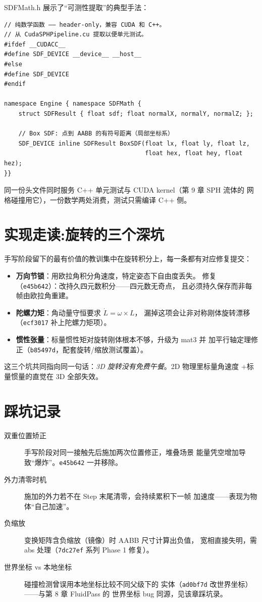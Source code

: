 SDFMath.h 展示了``可测性提取''的典型手法：

\begin{lstlisting}
// 纯数学函数 —— header-only，兼容 CUDA 和 C++。
// 从 CudaSPHPipeline.cu 提取以便单元测试。
#ifdef __CUDACC__
#define SDF_DEVICE __device__ __host__
#else
#define SDF_DEVICE
#endif

namespace Engine { namespace SDFMath {
    struct SDFResult { float sdf; float normalX, normalY, normalZ; };

    // Box SDF: 点到 AABB 的有符号距离（局部坐标系）
    SDF_DEVICE inline SDFResult BoxSDF(float lx, float ly, float lz,
                                       float hex, float hey, float hez);
}}
\end{lstlisting}

同一份头文件同时服务 C++ 单元测试与 CUDA kernel（第 9 章 SPH 流体的
网格碰撞用它），一份数学两处消费，测试只需编译 C++ 侧。

\section{实现走读:旋转的三个深坑}

手写阶段留下的最有价值的教训集中在旋转积分上，每一条都有对应修复提交：

\begin{itemize}
  \item \textbf{万向节锁}：用欧拉角积分角速度，特定姿态下自由度丢失。
        修复（\texttt{e45b642}）：改持久四元数积分——四元数无奇点，
        且必须持久保存而非每帧由欧拉角重建。
  \item \textbf{陀螺力矩}：角动量守恒要求 $\dot{L} = \omega \times L$，
        漏掉这项会让非对称刚体旋转漂移（\texttt{ecf3017} 补上陀螺力矩项）。
  \item \textbf{惯性张量}：标量惯性矩对旋转刚体根本不够，升级为 mat3 并
        加平行轴定理修正（\texttt{b85497d}，配套旋转/缩放测试覆盖）。
\end{itemize}

这三个坑共同指向同一句话：\emph{3D 旋转没有免费午餐}。2D 物理里标量角速度
+标量惯量的直觉在 3D 全部失效。

\section{踩坑记录}

\begin{description}
  \item[双重位置矫正] 手写阶段对同一接触先后施加两次位置修正，堆叠场景
        能量凭空增加导致``爆炸''。\texttt{e45b642} 一并移除。
  \item[外力清零时机] 施加的外力若不在 Step 末尾清零，会持续累积下一帧
        加速度——表现为物体``自己加速''。
  \item[负缩放] 变换矩阵含负缩放（镜像）时 AABB 尺寸计算出负值，
        宽相直接失明，需 abs 处理（\texttt{7dc27ef} 系列 Phase 1 修复）。
  \item[世界坐标 vs 本地坐标] 碰撞检测曾误用本地坐标比较不同父级下的
        实体（\texttt{ad0bf7d} 改世界坐标）——与第 8 章 FluidPass 的
        世界坐标 bug 同源，见该章踩坑录。
\end{description}

